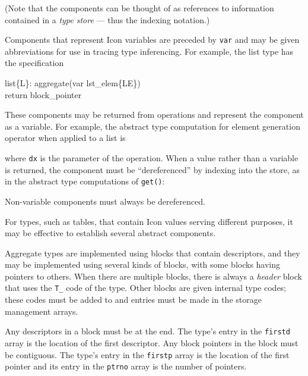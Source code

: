 \noindent
(Note that the components can be thought of as references to
information contained in a \textit{type store} --- thus the indexing notation.)

Components that represent Icon variables are preceded by \texttt{var} and may
be given abbreviations for use in tracing type inferencing. For
example, the list type has the specification
\begin{iconcode}
list\{L\}: \>\>\> aggregate(var lst\_elem\{LE\})\\
\>\>\>            return block\_pointer
\end{iconcode}

\noindent

These components may be returned from operations and represent the
component as a variable. For example, the abstract type computation
for element generation operator when applied to a list is


\noindent
where \texttt{dx} is the parameter of the operation. When a value rather
than a variable is returned, the component must be ``dereferenced'' by
indexing into the store, as in the abstract type computations of
\texttt{get()}:


\noindent
Non-variable components must always be dereferenced.

For types, such as tables, that contain Icon values serving different
purposes, it may be effective to establish several abstract components.

Aggregate types are implemented using blocks that contain descriptors, and
they may be implemented using several kinds of blocks, with some blocks
having pointers to others. When there are multiple blocks, there is always
a \textit{header} block that uses the \texttt{T\_} code of the type. Other
blocks are given internal type codes; these codes must be added to
 and entries must be made in the storage management
arrays.

Any descriptors in a block must be at the end. The type's entry in the
\texttt{firstd} array is the location of the first descriptor. Any block
pointers in the block must be contiguous. The type's entry in the
\texttt{firstp} array is the location of the first pointer and its
entry in the \texttt{ptrno} array is the number of pointers.

